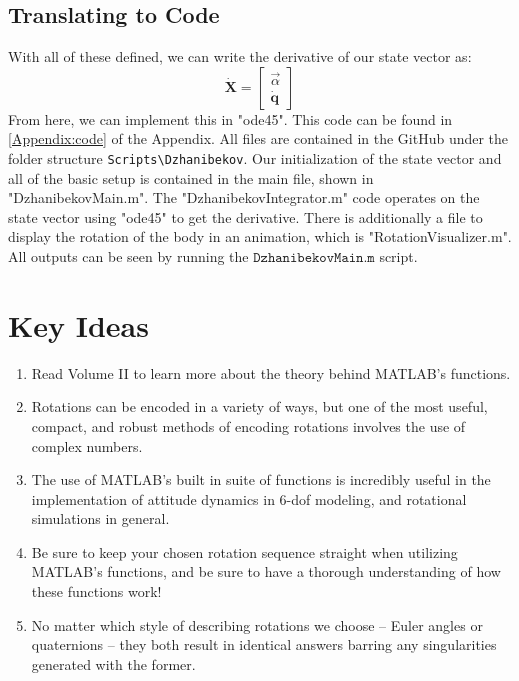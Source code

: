 \documentclass[10pt, openany, titlepage]{book}
\theoremstyle{definition}
\let\oldautoref\autoref
\renewcommand{\autoref}[1]{%
  \begingroup
  \hypersetup{linkcolor=black}%
  \oldautoref{#1}%
  \endgroup
}
\begin{document}
\subsection{Translating to Code}
With all of these defined, we can write the derivative of our \gls{state vector} as:
\begin{equation}
    \dot{\textbf{X}}=\begin{bmatrix}
        \vec{\alpha}\\\dot{\textbf{q}}
    \end{bmatrix}
\end{equation}
From here, we can implement this in "ode45". This code can be found in \autoref{Appendix:code} of the Appendix. All files are contained in the GitHub under the folder structure \texttt{Scripts\textbackslash Dzhanibekov}. Our initialization of the \gls{state vector} and all of the basic setup is contained in the main file, shown in "DzhanibekovMain.m". The "DzhanibekovIntegrator.m" code operates on the state vector using "ode45" to get the derivative. There is additionally a file to display the rotation of the body in an animation, which is "RotationVisualizer.m". All outputs can be seen by running the $\texttt{DzhanibekovMain.m}$ script.

\section{Key Ideas}
\begin{enumerate}
    \item Read Volume II to learn more about the theory behind MATLAB's functions.
    \item Rotations can be encoded in a variety of ways, but one of the most useful, compact, and robust methods of encoding rotations involves the use of complex numbers.
    \item The use of MATLAB's built in suite of functions is incredibly useful in the implementation of attitude dynamics in 6-\gls{dof} modeling, and rotational simulations in general.
    \item Be sure to keep your chosen rotation sequence straight when utilizing MATLAB's functions, and be sure to have a thorough understanding of how these functions work!
    \item No matter which style of describing rotations we choose -- \gls{Euler angles} or \glspl{quaternion} -- they both result in identical answers barring any singularities generated with the former.
\end{enumerate}
\end{document}
